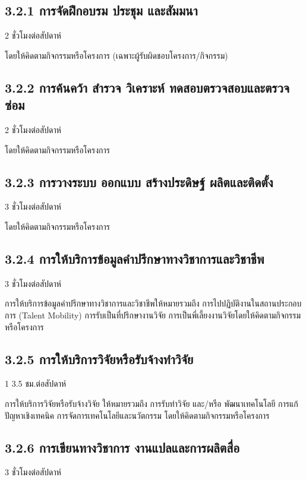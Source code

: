 \documentclass[a4paper,12pt,english]{sphinxmanual}
\begin{document}
\subsection{3.2.1  การจัดฝึกอบรม ประชุม และสัมมนา}
\label{\detokenize{3service:id13}}
2 ชั่วโมงต่อสัปดาห์

โดยให้คิดตามกิจกรรมหรือโครงการ (เฉพาะผู้รับผิดชอบโครงการ/กิจกรรม)


\subsection{3.2.2  การค้นคว้า สำรวจ วิเคราะห์ ทดสอบตรวจสอบและตรวจซ่อม}
\label{\detokenize{3service:id14}}
2 ชั่วโมงต่อสัปดาห์

โดยให้คิดตามกิจกรรมหรือโครงการ


\subsection{3.2.3 การวางระบบ ออกแบบ สร้างประดิษฐ์ ผลิตและติดตั้ง}
\label{\detokenize{3service:id15}}
3 ชั่วโมงต่อสัปดาห์

โดยให้คิดตามกิจกรรมหรือโครงการ


\subsection{3.2.4  การให้บริการข้อมูลคำปรึกษาทางวิชาการและวิชาชีพ}
\label{\detokenize{3service:id16}}
3 ชั่วโมงต่อสัปดาห์

การให้บริการข้อมูลคำปรึกษาทางวิชาการและวิชาชีพให้หมายรวมถึง การไปปฏิบัติงานในสถานประกอบการ (Talent Mobility) การรับเป็นที่ปรึกษางานวิจัย การเป็นพี่เลี้ยงงานวิจัยโดยให้คิดตามกิจกรรมหรือโครงการ


\subsection{3.2.5  การให้บริการวิจัยหรือรับจ้างทำวิจัย}
\label{\detokenize{3service:id17}}
1 \sphinxhyphen{} 3.5  ชม.ต่อสัปดาห์

การให้บริการวิจัยหรือรับจ้างวิจัย ให้หมายรวมถึง การรับทำวิจัย และ/หรือ พัฒนาเทคโนโลยี การแก้ปัญหาเชิงเทคนิค การจัดการเทคโนโลยีและนวัตกรรม
โดยให้คิดตามกิจกรรมหรือโครงการ


\subsection{3.2.6  การเขียนทางวิชาการ งานแปลและการผลิตสื่อ}
\label{\detokenize{3service:id18}}
3 ชั่วโมงต่อสัปดาห์
\end{document}
